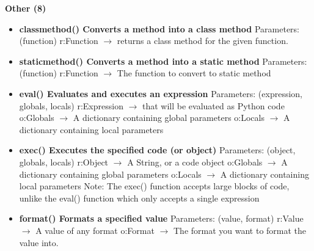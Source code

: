\documentclass{report}
\begin{document}
    \bigbreak \noindent 
    
      \begin{center}
        \textbf{Other (8)}
      \end{center}
      \begin{itemize}
        \item[\ding{43}] \textbf{classmethod()	Converts a method into a class method}
          \smallbreak \noindent
          Parameters: (function)
          \smallbreak \noindent
          r:Function $\rightarrow$ returns a class method for the given function.
          \smallbreak \noindent
        \item[\ding{43}] \textbf{staticmethod()	Converts a method into a static method}
          \smallbreak \noindent
          Parameters: (function)
          \smallbreak \noindent
          r:Function $\rightarrow$ The function to convert to static method
          \smallbreak \noindent
        \item[\ding{43}] \textbf{eval()	Evaluates and executes an expression}
          \smallbreak \noindent
          Parameters: (expression, globals, locals)
          \smallbreak \noindent
          r:Expression $\rightarrow$ that will be evaluated as Python code
          \smallbreak \noindent
          o:Globals $\rightarrow$ A dictionary containing global parameters
          \smallbreak \noindent
          o:Locals $\rightarrow$ A dictionary containing local parameters
          \smallbreak \noindent
        \item[\ding{43}] \textbf{exec()	Executes the specified code (or object)}
          \smallbreak \noindent
          Parameters: (object, globals, locals)
          \smallbreak \noindent
          r:Object $\rightarrow$ 	A String, or a code object
          \smallbreak \noindent
          o:Globals $\rightarrow$ A dictionary containing global parameters
          \smallbreak \noindent
          o:Locals $\rightarrow$ A dictionary containing local parameters
          \smallbreak \noindent
          Note: The exec() function accepts large blocks of code, unlike the eval() function which only accepts a single expression
          \smallbreak \noindent
        \item[\ding{43}] \textbf{format()	Formats a specified value}
          \smallbreak \noindent
          Parameters: (value, format)
          \smallbreak \noindent
          r:Value $\rightarrow$ A value of any format
          \smallbreak \noindent
          o:Format $\rightarrow$ The format you want to format the value into.
          \smallbreak \noindent

\end{itemize}
\end{document}
